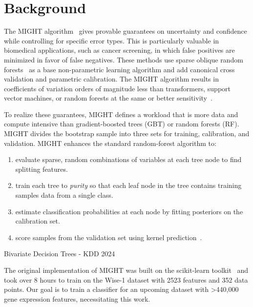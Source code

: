\documentclass[sigconf,anonymous,review]{acmart}
\begin{document}
\section{Background}\label{sec:bg}

The MIGHT algorithm~\cite{might1,might2} gives provable guarantees on uncertainty and confidence while controlling for specific error types. This is particularly valuable in biomedical applications, such as cancer screening, in which false positives are minimized in favor of false negatives. These methods use sparse oblique random forests~\cite{tomita2020sparse} as a base non-parametric learning algorithm and add canonical cross validation and parametric calibration. The MIGHT algorithm results in coefficients of variation orders of magnitude less than transformers, support vector machines, or random forests at the same or better sensitivity~\cite{might1}.

To realize these guarantees, MIGHT defines a workload that is more data and compute intensive than gradient-boosted trees (GBT) or random forests (RF). MIGHT divides the bootstrap sample into three sets for training, calibration, and validation. MIGHT enhances the standard random-forest algorithm to:
\begin{enumerate}
    \item\label{it:sparsity} evaluate sparse, random combinations of variables at each tree node to find splitting features.
    \item\label{it:purity} train each tree to {\em purity} so that each leaf node in the tree contains training samples data from a single class.
    \item estimate classification probabilities at each node by fitting posteriors on the calibration set.
    \item score samples from the validation set using kernel prediction~\cite{kernel}.
\end{enumerate}

Bivariate Decision Trees - KDD 2024 \cite{https://kdd.org/kdd2024/research-track-papers/}

\noindent The original implementation of MIGHT was built on the scikit-learn toolkit~\cite{pedregosa2011scikit,treeple} and took over 8 hours to train on the Wise-1 dataset with 2523 features and 352 data points. Our goal is to train a classifier for an upcoming dataset with >440,000 gene expression features, necessitating this work.
\end{document}

